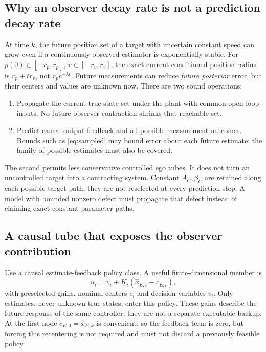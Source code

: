 \documentclass[10pt,letterpaper]{article}
\begin{document}
\subsection{Why an observer decay rate is not a prediction decay rate}
At time $k$, the future position set of a target with uncertain constant speed
can grow even if a continuously observed estimator is exponentially stable.
For $p(0)\in[-r_p,r_p]$, $v\in[-r_v,r_v]$, the exact current-conditioned
position radius is $r_p+tr_v$, not $r_pe^{-\lambda t}$.
Future measurements can reduce \emph{future posterior} error, but their centers
and values are unknown now. There are two sound operations:
\begin{enumerate}[nosep]
\item Propagate the current true-state set under the plant with common
open-loop inputs. No future observer contraction shrinks that reachable set.
\item Predict causal output feedback and all possible measurement outcomes.
Bounds such as \eqref{eq:sampled} may bound error about each future estimate;
the family of possible estimates must also be covered.
\end{enumerate}
The second permits less conservative controlled ego tubes. It does not turn
an uncontrolled target into a contracting system. Constant $A_C,\beta_C$ are
retained along each possible target path; they are not reselected at every
prediction step. A model with bounded nonzero defect must propagate that defect
instead of claiming exact constant-parameter paths.

\subsection{A causal tube that exposes the observer contribution}
Use a causal estimate-feedback policy class. A useful finite-dimensional
member is
\begin{equation}\label{eq:policy}
u_i=v_i+K_i(\hat x_{E,i}-c_{E,i}),
\end{equation}
with preselected gains, nominal centers $c_i$ and decision variables $v_i$.
Only estimates, never unknown true states, enter this policy. These gains
describe the future response of the same controller; they are not a separate
executable backup. At the first node $c_{E,0}=\hat x_{E,k}$ is convenient, so
the feedback term is zero, but forcing this recentering is not required and
must not discard a previously feasible policy.
\end{document}
